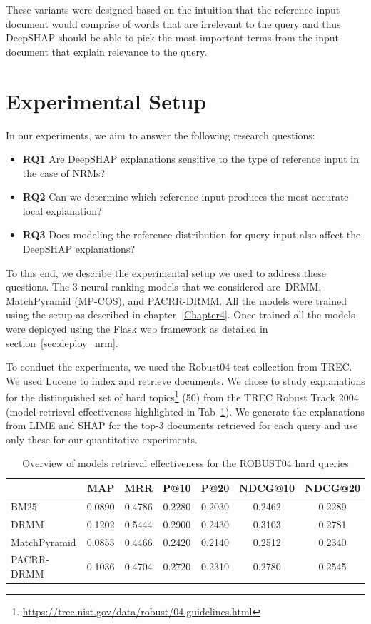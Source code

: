 These variants were designed based on the intuition that the reference input document would comprise of words that are irrelevant to the query and thus DeepSHAP should be able to pick the most important terms from the input document that explain relevance to the query.

\section{Experimental Setup}
\label{sec:lime_shap_exp_setup}
In our experiments, we aim to answer the following research questions:

\begin{itemize}
    \item \textbf{RQ1} Are DeepSHAP explanations sensitive to the type of reference input in the case of NRMs?
    \item \textbf{RQ2} Can we determine which reference input produces the most accurate local explanation?
    \item \textbf{RQ3} Does modeling the reference distribution for query input also affect the DeepSHAP explanations?
\end{itemize}

To this end, we describe the experimental setup we used to address these questions. The 3 neural ranking models that we considered are--DRMM, MatchPyramid (MP-COS), and PACRR-DRMM. All the models were trained using the setup as described in chapter~\ref{Chapter4}. Once trained all the models were deployed using the Flask web framework as detailed in section~\ref{sec:deploy_nrm}.

To conduct the experiments, we used the Robust04 test collection from TREC. We used Lucene to index and retrieve documents. We chose to study explanations for the distinguished set of hard topics\footnote{\url{https://trec.nist.gov/data/robust/04.guidelines.html}} (50) from the TREC Robust Track 2004 (model retrieval effectiveness highlighted in Tab~\ref{tab:robust04_difficult_rank_measures}). We generate the explanations from LIME and SHAP for the top-3 documents retrieved for each query and use only these for our quantitative experiments.

\begin{table}[h]
\centering
\begin{tabular}{lcccccc} 
 \toprule
 & MAP & MRR & P@10 & P@20 & NDCG@10 & NDCG@20\\
 \midrule
 BM25 & 0.0890 & 0.4786 & 0.2280 & 0.2030 & 0.2462 & 0.2289\\
 DRMM & 0.1202 & 0.5444 & 0.2900 & 0.2430 & 0.3103 & 0.2781\\
 MatchPyramid & 0.0855 & 0.4466 & 0.2420 & 0.2140 & 0.2512 & 0.2340\\
 PACRR-DRMM & 0.1036 & 0.4704 & 0.2720 & 0.2310 & 0.2780 & 0.2545\\
 \bottomrule
\end{tabular}
\caption{Overview of models retrieval effectiveness for the ROBUST04 hard queries}
\label{tab:robust04_difficult_rank_measures}
\end{table}

